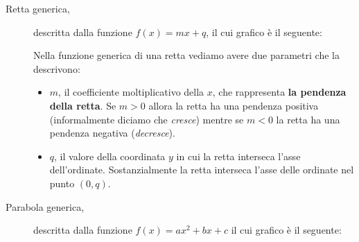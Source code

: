 \documentclass[12pt]{report}
\begin{document}
	\begin{description}
		
		\item [Retta generica,] descritta dalla funzione $f(x) = mx + q$, il cui grafico è il seguente:
		
		\begin{center}
			
			
		\end{center}
		
		Nella funzione generica di una retta vediamo avere due parametri che la descrivono:
		\begin{itemize}
			
			\item $m$, il coefficiente moltiplicativo della $x$, che rappresenta \textbf{la pendenza della retta}. Se $m > 0$ allora la retta ha una pendenza positiva (informalmente diciamo che \textit{cresce}) mentre se $m < 0$ la retta ha una pendenza negativa (\textit{decresce}).
			
			\item $q$, il valore della coordinata $y$ in cui la retta interseca l'asse dell'ordinate. Sostanzialmente la retta interseca l'asse delle ordinate nel punto $(0, q)$.
			
		\end{itemize}
		
		\item [Parabola generica,] descritta dalla funzione $f(x) = ax^2 + bx + c$ il cui grafico è il seguente:
		\begin{center}
			
\end{center}
\end{description}
\end{document}
